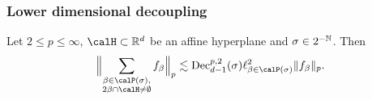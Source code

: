 \subsubsection{Lower dimensional decoupling}\label{sec:gen:lower-dim}

\begin{lemma}\label{lem:hyperplane-dec}
Let $2 \leq p \leq \infty$, $\calH \subset \R^{d}$ be an affine hyperplane and $\sigma \in 2^{-\mathbb{N}}$.
Then
\begin{equation}
\label{eq:hyperplane-dec}
\norm[\Big]{\sum_{\substack{\beta \in \Part{\sigma},\\ 2\beta\cap \calH\neq \emptyset}} f_{\beta} }_{p}
\lesssim
\Dec^{p,2}_{d-1}(\sigma)
\ell^{2}_{\beta \in \Part{\sigma}} \norm{f_{\beta}}_{p}.
\end{equation}
\end{lemma}
